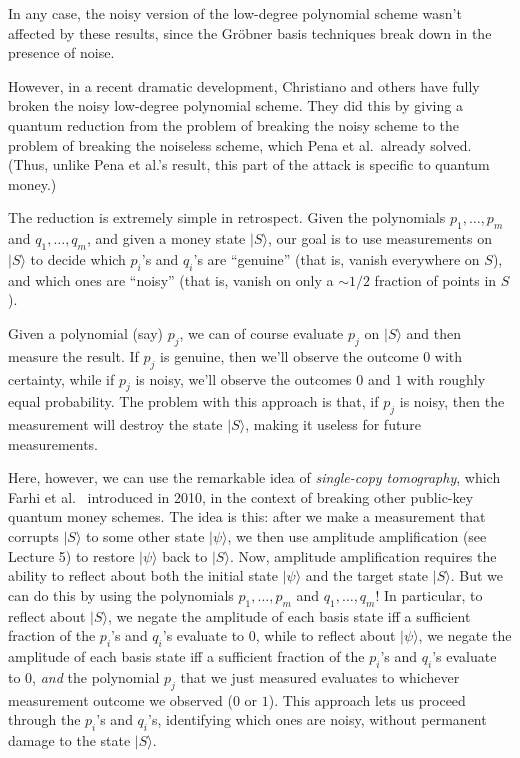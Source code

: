 \documentclass[12pt]{report}
\theoremstyle{plain}
\theoremstyle{definition}
\renewcommand{\ket}[1]{|#1\rangle}
\begin{document}
In any case, the noisy version of the low-degree polynomial scheme wasn't affected by these results, since the Gr\"{o}bner basis techniques break down in the presence of noise.

However, in a recent dramatic development, Christiano and others have fully broken the noisy low-degree polynomial scheme.  They did this by giving a quantum reduction from the problem of breaking the noisy scheme to the problem of breaking the noiseless scheme, which Pena et al.\ already solved.  (Thus, unlike Pena et al.'s result, this part of the attack is specific to quantum money.)

The reduction is extremely simple in retrospect.  Given the polynomials $p_1,\ldots,p_m$ and $q_1,\ldots,q_m$, and given a money state $\ket{S}$, our goal is to use measurements on $\ket{S}$ to decide which $p_i$'s and $q_i$'s are ``genuine'' (that is, vanish everywhere on $S$), and which ones are ``noisy'' (that is, vanish on only a $\sim 1/2$ fraction of points in $S$).

Given a polynomial (say) $p_j$, we can of course evaluate $p_j$ on $\ket{S}$ and then measure the result.  If $p_j$ is genuine, then we'll observe the outcome $0$ with certainty, while if $p_j$ is noisy, we'll observe the outcomes $0$ and $1$ with roughly equal probability.  The problem with this approach is that, if $p_j$ is noisy, then the measurement will destroy the state $\ket{S}$, making it useless for future measurements.

Here, however, we can use the remarkable idea of {\em single-copy tomography}, which Farhi et al.\ \cite{farhi:restore} introduced in 2010, in the context of breaking other public-key quantum money schemes.  The idea is this: after we make a measurement that corrupts $\ket{S}$ to some other state $\ket{\psi}$, we then use amplitude amplification (see Lecture 5) to restore $\ket{\psi}$ back to $\ket{S}$.  Now, amplitude amplification requires the ability to reflect about both the initial state $\ket{\psi}$ and the target state $\ket{S}$.  But we can do this by using the polynomials $p_1,\ldots,p_m$ and $q_1,\ldots,q_m$!  In particular, to reflect about $\ket{S}$, we negate the amplitude of each basis state iff a sufficient fraction of the $p_i$'s and $q_i$'s evaluate to $0$, while to reflect about $\ket{\psi}$, we negate the amplitude of each basis state iff a sufficient fraction of the $p_i$'s and $q_i$'s evaluate to $0$, {\em and} the polynomial $p_j$ that we just measured evaluates to whichever measurement outcome we observed ($0$ or $1$).  This approach lets us proceed through the $p_i$'s and $q_i$'s, identifying which ones are noisy, without permanent damage to the state $\ket{S}$.
\end{document}

